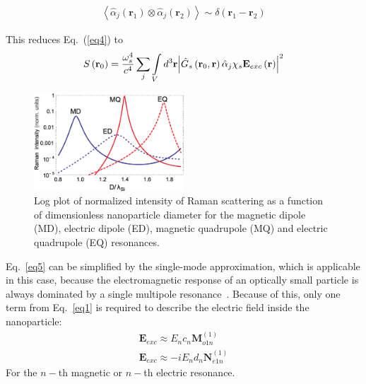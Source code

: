         \begin{align}
            \left\langle {\hat \alpha_j \left( {{{\mathbf{r}}_1}} \right) \otimes \hat \alpha_j \left( {{{\mathbf{r}}_2}} \right)} \right\rangle \sim \delta \left({{\mathbf{r}_1} - {\mathbf{r}_2}} \right)
        \end{align}

        This reduces Eq.~(\ref{eq4}) to
        \begin{align}
            S\left( {{{\bf{r}}_0}} \right) = \frac{{\omega _s^4}}{{{c^4}}}\sum\limits_j {\int\limits_V {{d^3}{\bf{r}}{{\left| {{{\hat G}_s}\left(
            {{{\bf{r}}_0},{\bf{r}}} \right){{\hat \alpha }_j}{\chi _s}{{\bf{E}}_{exc}}\left( {\bf{r}} \right)} \right|}^2}} }
            \label{eq5}
        \end{align}
        \begin{figure}[h!]
            \begin{center}
                \includegraphics[width=0.5\textwidth]{figs/intro/TheoryEnhancement.eps}
            \end{center}
            \caption{Log plot of normalized intensity of Raman scattering as a function of dimensionless nanoparticle diameter for the magnetic dipole (MD),
            electric dipole (ED), magnetic quadrupole (MQ) and electric quadrupole (EQ) resonances.}
            \label{fig:TheoryEnhancement}
        \end{figure}

            Eq.~\ref{eq5} can be simplified by the single-mode approximation, which is applicable in this case, because the electromagnetic
        response of an optically small particle is always dominated by a single multipole resonance~\cite{evlyukhin2010optical}. Because
        of this, only one term from Eq.~\ref{eq1} is required to describe the electric field inside the nanoparticle:
        \begin{align}
            {{\mathbf{{E}}}_{exc}} \approx {E_n}{c_n}{\mathbf{M}}_{o1n}^{(1)} \\
            {{\mathbf{{E}}}_{exc}}\approx -i{E_n}{d_n}{\mathbf{N}}_{e1n}^{(1)}
        \end{align}
        For the $n-$th magnetic or $n-$th electric resonance.

